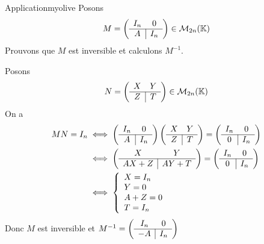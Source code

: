     \begin{omed}{Application}{myolive}
        Posons 
        \[ M = \left( \begin{array}{c | c}
            I_n & 0 \\
            \hline 
            A & I_n
        \end{array} \right) \in \mathcal{M}_{2n}(\mathbb{K}) \]
        Prouvons que $M$ est inversible et calculons $M^{-1}$.

        Posons
        \[ N = \left( \begin{array}{c | c}
            X & Y \\
            \hline 
            Z & T 
        \end{array} \right) \in \mathcal{M}_{2n}(\mathbb{K}) \]
        On a 
        \begin{align*}
            MN = I_n 
            &\iff \left( \begin{array}{c | c}
                I_n & 0 \\
                \hline 
                A & I_n
            \end{array} \right) \left( \begin{array}{c | c}
                X & Y \\
                \hline 
                Z & T 
            \end{array} \right) = \left( \begin{array}{c | c}
                I_n & 0 \\
                \hline 
                0 & I_n
            \end{array} \right) \\
            & \iff \left( \begin{array}{c | c}
                X & Y \\
                \hline 
                AX + Z & AY + T
            \end{array} \right) = \left( \begin{array}{c | c}
                I_n & 0 \\
                \hline 
                0 & I_n
            \end{array} \right) \\
            &\iff \left\{ 
            \begin{array}{l}
                X = I_n \\
                Y = 0 \\
                A + Z = 0 \\
                T = I_n 
            \end{array}
            \right.
        \end{align*}
        Donc $M$ est inversible et $M^{-1} = \left( \begin{array}{c | c}
            I_n & 0 \\
            \hline 
            -A & I_n
        \end{array} \right)$
    \end{omed}

